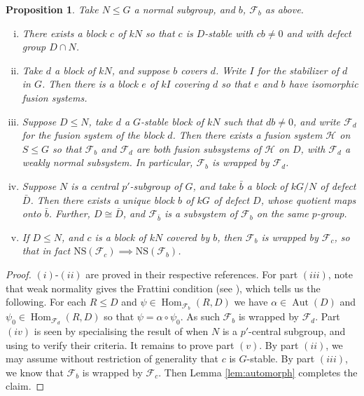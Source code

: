 \documentclass{amsart}
\theoremstyle{plain}\newtheorem{theorem}{Theorem}[section]
\theoremstyle{plain}\newtheorem{conjecture}[theorem]{Conjecture}
\theoremstyle{plain}\newtheorem{corollary}[theorem]{Corollary}
\theoremstyle{plain}\newtheorem{lemma}[theorem]{Lemma}
\theoremstyle{plain}\newtheorem{proposition}[theorem]{Proposition}
\theoremstyle{plain}\newtheorem{statement}[theorem]{}
\theoremstyle{definition}\newtheorem{definition}[theorem]{Definition}
\theoremstyle{definition}\newtheorem{example}[theorem]{Example}
\theoremstyle{definition}\newtheorem{examples}[theorem]{Examples}
\theoremstyle{definition}\newtheorem{notation}[theorem]{Notation}
\theoremstyle{definition}\newtheorem{remark}[theorem]{Remark}
\theoremstyle{definition}\newtheorem{remarks}[theorem]{Remarks}
\theoremstyle{definition}\newtheorem{question}[theorem]{Question}
\theoremstyle{definition}\newtheorem{propositiondefinition}[theorem]{Definition/Proposition}
\DeclareMathOperator{\Hom}{Hom}
\begin{document}
 \begin{proposition}\label{prop:usefulprop}
	 Take $N \leq G$ a normal subgroup, and $b$, $\mathcal{F}_b$ as above. 
    \begin{enumerate}[(i)]
        \item\cite[Lemma 6.1]{KS}\label{part:usefulprop1} There exists a block $c$ of $kN$ so that $c$ is $D$-stable with $cb \not=0$ and with defect group $D \cap N$.
        \item\cite[Part IV, Proposition 6.3]{AKO}\label{part:usefulprop2} Take $d$ a block of $kN$, and suppose $b$ covers $d$. Write $I$ for the stabilizer of $d$ in $G$. Then there is a block $e$ of $kI$ covering $d$ so that $e$ and $b$ have isomorphic fusion systems.
	\item\cite[Theorem 3.5]{KS}\label{part:normalsubsystem} Suppose $D \leq N$, take $d$ a $G$-stable block of $kN$ such that $db\not=0$, and write $\mathcal{F}_d$ for the fusion system of the block $d$. Then there exists a fusion system $\mathcal{H}$ on $S \leq G$ so that $\mathcal{F}_b$ and $\mathcal{F}_d$ are both fusion subsystems of $\mathcal{H}$ on $D$, with $\mathcal{F}_d$ a weakly normal subsystem. In particular, $\mathcal{F}_b$ is wrapped by $\mathcal{F}_d$.
	\item\cite[Lemma 3.2]{Eisele}\label{part:quotients} Suppose $N$ is a central $p'$-subgroup of $G$, and take $\bar{b}$ a block of $kG/N$ of defect $\bar{D}$. Then there exists a unique block $b$ of $kG$ of defect $D$, whose quotient maps onto $\bar{b}$. Further, $D \cong \bar{D}$, and $\mathcal{F}_{\bar{b}}$ is a subsystem of $\mathcal{F}_{b}$ on the same $p$-group.
	\item\label{part:normalimplication} If $D \leq N$, and $c$ is a block of $kN$ covered by $b$, then $\mathcal{F}_b$ is wrapped by $\mathcal{F}_c$, so that in fact $\mathrm{NS}(\mathcal{F}_c) 
\implies \mathrm{NS}(\mathcal{F}_b)$. 
    \end{enumerate}
 \end{proposition}
 \begin{proof} $(i)$-$(ii)$ are proved in their respective references. For part $(iii)$, note that weak normality gives the Frattini condition (see \cite[Part I, Definition 6.1]{AKO}), which tells us the following. For each $R \leq D$ and $\psi \in \Hom_{\mathcal{F}_b}(R, D)$ we have $\alpha \in \operatorname{Aut}(D)$ and $\psi_0 \in \Hom_{\mathcal{F}_d}(R,D)$ so that $\psi = \alpha \circ \psi_0$. As such $\mathcal{F}_b$ is wrapped by $\mathcal{F}_d$. Part $(iv)$ is seen by specialising the result of \cite{Eisele} when $N$ is a $p'$-central subgroup, and using \cite[Theorem 5.8.8]{Nagao} to verify their criteria. It remains to prove part $(v)$. By part $(ii)$, we may assume without restriction of generality that $c$ is $G$-stable. By part $(iii)$, we know that $\mathcal{F}_b$ is wrapped by $\mathcal{F}_c$. Then Lemma \ref{lem:automorph} completes the claim.  
\end{proof}
\end{document}
